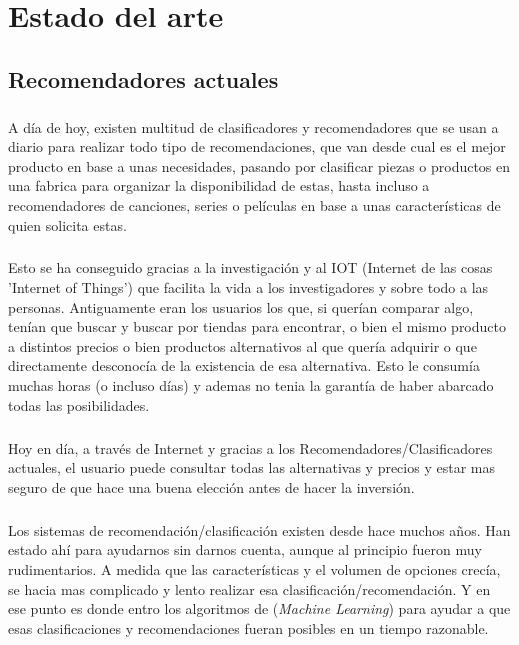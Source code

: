 \chapter{Estado del arte}
\label{chapter:estado_del_arte}


\section{Recomendadores actuales}

\paragraph{}
A día de hoy, existen multitud de clasificadores y recomendadores\cite{ref:sorter_art_1} que se usan a diario para realizar todo tipo de recomendaciones, que van desde cual es el mejor producto en base a unas necesidades, pasando por clasificar piezas o productos en una fabrica para organizar la disponibilidad de estas, hasta incluso a recomendadores de canciones, series o películas en base a unas características de quien solicita estas.

\paragraph{}
Esto se ha conseguido gracias a la investigación y al IOT (Internet de las cosas 'Internet of Things') que facilita la vida a los investigadores y sobre todo a las personas. Antiguamente eran los usuarios los que, si querían comparar algo, tenían que buscar y buscar por tiendas para encontrar, o bien el mismo producto a distintos precios o bien productos alternativos al que quería adquirir o que directamente desconocía de la existencia de esa alternativa. Esto le consumía muchas horas (o incluso días) y ademas no tenia la garantía de haber abarcado todas las posibilidades.

\paragraph{}
Hoy en día, a través de Internet y gracias a los Recomendadores/Clasificadores actuales, el usuario puede consultar todas las alternativas y precios y estar mas seguro de que hace una buena elección antes de hacer la inversión.

\paragraph{}
Los sistemas de recomendación/clasificación existen desde hace muchos años\cite{ref:history_recommender}. Han estado ahí para ayudarnos sin darnos cuenta, aunque al principio fueron muy rudimentarios. A medida que las características y el volumen de opciones crecía, se hacia mas complicado y lento realizar esa clasificación/recomendación. Y en ese punto es donde entro los algoritmos de (\textit{Machine Learning}) para ayudar a que esas clasificaciones y recomendaciones fueran posibles en un tiempo razonable.

